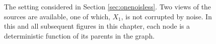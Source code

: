 \begin{figure}[t!]
	\centering
	\caption{The setting considered in Section \ref{sec:onenoisless}. Two views of the sources are available, one of which, $X_1$, is not corrupted by noise. In this and all subsequent figures in this chapter, each node is a deterministic function of its parents in the graph.
	}
	\label{fig:generalized_hsr_basic}
\end{figure}

\medskip


